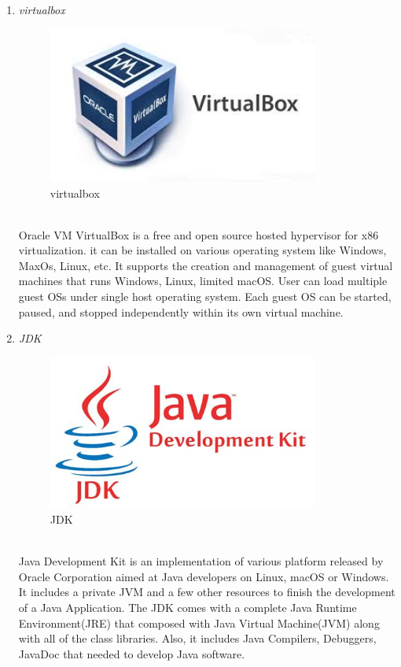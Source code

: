 \documentclass[conference]{IEEEtran}
\begin{document}
\begin{enumerate}
    \item \textit{virtualbox }
                    \begin{figure}[htbp]
    \centerline{\includegraphics[width=89mm, scale=0.5]{fig/virtual_box.jpg}}
    \caption{virtualbox}
    \label{fig}
    \end{figure}
   \\Oracle VM VirtualBox is a free and open source hosted hypervisor for x86 virtualization. it can be installed on various operating system like Windows, MaxOs, Linux, etc. It supports the creation and management of guest virtual machines that runs Windows, Linux, limited macOS. User can load multiple guest OSs under single host operating system. Each guest OS can be started, paused, and stopped independently within its own virtual machine.\\
   \item \textit{JDK }
                   \begin{figure}[htbp]
    \centerline{\includegraphics[width=89mm, scale=0.5]{fig/jdk.png}}
    \caption{JDK}
    \label{fig}
    \end{figure}
   \\Java Development Kit is an implementation of various platform released by Oracle Corporation aimed at Java developers on Linux, macOS or Windows. It includes a private JVM and a few other resources to finish the development of a Java Application.  The JDK comes with a complete Java Runtime Environment(JRE) that composed with  Java Virtual Machine(JVM) along with all of the class libraries. Also, it includes Java Compilers, Debuggers, JavaDoc that needed to develop Java software.\\

\end{enumerate}
\end{document}

